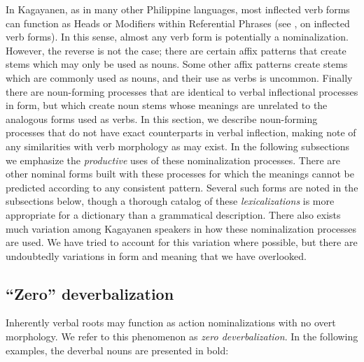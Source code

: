 In Kagayanen, as in many other Philippine languages, most inflected verb forms can function as Heads  or Modifiers within Referential Phrases (see ,  on inflected verb forms). In this sense, almost any verb form is potentially a nominalization. However, the reverse is not the case; there are certain affix patterns that create stems which may only be used as nouns. Some other affix patterns create stems which are commonly used as nouns, and their use as verbs is uncommon. Finally there are noun-forming processes that are identical to verbal inflectional processes in form, but which create noun stems whose meanings are unrelated to the analogous forms used as verbs. In this section, we describe noun-forming processes that do not have exact counterparts in verbal inflection, making note of any similarities with verb morphology as may exist. In the following subsections we emphasize the \textit{productive} uses of these nominalization processes. There are other nominal forms built with these processes for which the meanings cannot be predicted according to any consistent pattern. Several such forms are noted in the subsections below, though a thorough catalog of these \textit{lexicalizations} is more appropriate for a dictionary than a grammatical description. There also exists much variation among Kagayanen speakers in how these nominalization processes are used. We have tried to account for this variation where possible, but there are undoubtedly variations in form and meaning that we have overlooked.

\subsection{“Zero” deverbalization}
\label{sec:zerodeverbalization}

Inherently verbal roots may function as action nominalizations with no overt morphology. We refer to this phenomenon as \textit{zero deverbalization}. In the following examples, the deverbal nouns are presented in bold:

